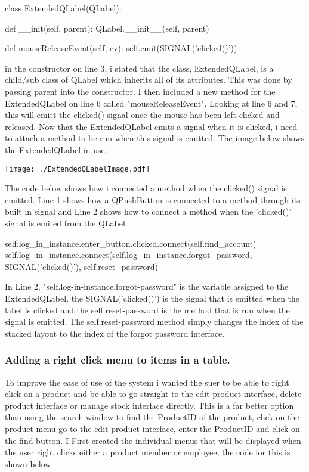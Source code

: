 \begin{python}
class ExtendedQLabel(QLabel):
 
    def __init(self, parent):
        QLabel.__init__(self, parent)
 
    def mouseReleaseEvent(self, ev):
        self.emit(SIGNAL('clicked()'))
\end{python}

in the constructor on line 3, i stated that the class, ExtendedQLabel, is a child/sub class of QLabel which inherits all of its attributes. This was done by passing parent into the constructor. I then included a new method for the ExtendedQLabel on line 6 called "mouseReleaseEvent". Looking at line 6 and 7, this will emitt the clicked() signal once the mouse has been left clicked and released. Now that the ExtendedQLabel emits a signal when it is clicked, i need to attach a method to be run when this signal is emitted. The image below shows the ExtendedQLabel in use:

\texttt{[image: ./ExtendedQLabelImage.pdf]}

The code below shows how i connected a method when the clicked() signal is emitted. Line 1 shows how a QPushButton is connected to a method through its built in signal and Line 2 shows how to connect a method when the 'clicked()' signal is emited from the QLabel.

\begin{python}
self.log_in_instance.enter_button.clicked.connect(self.find_account)
self.log_in_instance.connect(self.log_in_instance.forgot_password, SIGNAL('clicked()'), self.reset_password)
\end{python}

In Line 2, "self.log-in-instance.forgot-password" is the variable assigned to the ExtendedQLabel, the SIGNAL('clicked()') is the signal that is emitted when the label is clicked and the self.reset-password is the method that is run when the signal is emitted. The self.reset-password method simply changes the index of the stacked layout to the index of the forgot password interface.

\subsubsection{Adding a right click menu to items in a table.}

To improve the ease of use of the system i wanted the suer to be able to right click on a product and be able to go straight to the edit product interface, delete product interface or manage stock interface directly. This is a far better option than using the search window to find the ProductID of the product, click on the product menu go to the edit product interface, enter the ProductID and click on the find button. I First created the individual menus that will be displayed when the user right clicks either a product member or employee, the code for this is shown below.

